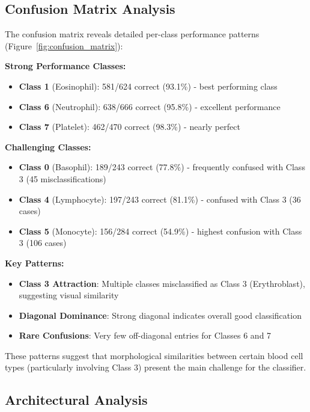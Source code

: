 \documentclass[runningheads]{llncs}
\begin{document}
\subsection{Confusion Matrix Analysis}

The confusion matrix reveals detailed per-class performance patterns (Figure~\ref{fig:confusion_matrix}):

\textbf{Strong Performance Classes:}
\begin{itemize}
    \item \textbf{Class 1} (Eosinophil): 581/624 correct (93.1\%) - best performing class
    \item \textbf{Class 6} (Neutrophil): 638/666 correct (95.8\%) - excellent performance
    \item \textbf{Class 7} (Platelet): 462/470 correct (98.3\%) - nearly perfect
\end{itemize}

\textbf{Challenging Classes:}
\begin{itemize}
    \item \textbf{Class 0} (Basophil): 189/243 correct (77.8\%) - frequently confused with Class 3 (45 misclassifications)
    \item \textbf{Class 4} (Lymphocyte): 197/243 correct (81.1\%) - confused with Class 3 (36 cases)
    \item \textbf{Class 5} (Monocyte): 156/284 correct (54.9\%) - highest confusion with Class 3 (106 cases)
\end{itemize}

\textbf{Key Patterns:}
\begin{itemize}
    \item \textbf{Class 3 Attraction}: Multiple classes misclassified as Class 3 (Erythroblast), suggesting visual similarity
    \item \textbf{Diagonal Dominance}: Strong diagonal indicates overall good classification
    \item \textbf{Rare Confusions}: Very few off-diagonal entries for Classes 6 and 7
\end{itemize}

These patterns suggest that morphological similarities between certain blood cell types (particularly involving Class 3) present the main challenge for the classifier.

\subsection{Architectural Analysis}
\end{document}

